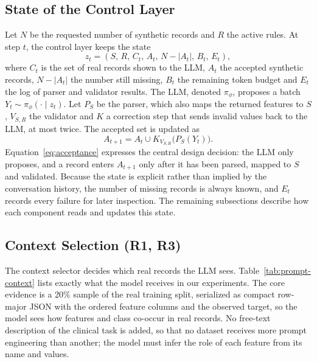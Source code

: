 \documentclass[conference]{IEEEtran}
\begin{document}
\subsection{State of the Control Layer}
Let $N$ be the requested number of synthetic records and $R$ the active rules. At step $t$, the control layer keeps the state
\begin{equation}
z_t=(S,\,R,\,C_t,\,A_t,\,N-|A_t|,\,B_t,\,E_t),
\label{eq:state}
\end{equation}
where $C_t$ is the set of real records shown to the LLM, $A_t$ the accepted synthetic records, $N-|A_t|$ the number still missing, $B_t$ the remaining token budget and $E_t$ the log of parser and validator results. The LLM, denoted $\pi_{\phi}$, proposes a batch $Y_t\sim\pi_{\phi}(\cdot\mid z_t)$. Let $P_S$ be the parser, which also maps the returned features to $S$, $V_{S,R}$ the validator and $K$ a correction step that sends invalid values back to the LLM, at most twice. The accepted set is updated as
\begin{equation}
A_{t+1}=A_t\cup K_{V_{S,R}}\bigl(P_S(Y_t)\bigr).
\label{eq:acceptance}
\end{equation}
Equation~\eqref{eq:acceptance} expresses the central design decision: the LLM only proposes, and a record enters $A_{t+1}$ only after it has been parsed, mapped to $S$ and validated. Because the state is explicit rather than implied by the conversation history, the number of missing records is always known, and $E_t$ records every failure for later inspection. The remaining subsections describe how each component reads and updates this state.

\subsection{Context Selection (R1, R3)}
The context selector decides which real records the LLM sees. Table~\ref{tab:prompt-context} lists exactly what the model receives in our experiments. The core evidence is a 20\% sample of the real training split, serialized as compact row-major JSON with the ordered feature columns and the observed target, so the model sees how features and class co-occur in real records. No free-text description of the clinical task is added, so that no dataset receives more prompt engineering than another; the model must infer the role of each feature from its name and values.
\end{document}
